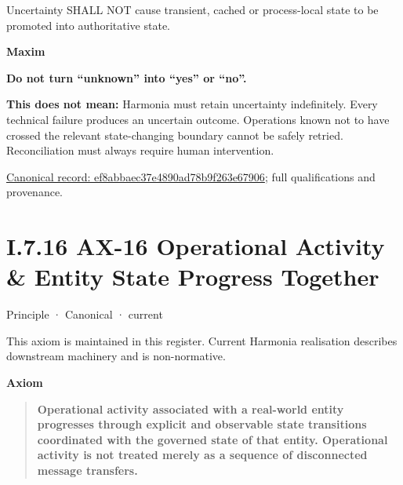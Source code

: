 Uncertainty SHALL NOT cause transient, cached or process-local state to be promoted into authoritative state.



\par\medskip\textbf{Maxim}\par


\textbf{Do not turn “unknown” into “yes” or “no”.}



\textbf{This does not mean:} Harmonia must retain uncertainty indefinitely. Every technical failure produces an uncertain outcome. Operations known not to have crossed the relevant state-changing boundary cannot be safely retried. Reconciliation must always require human intervention.


{\footnotesize \href{../../../../continuum/motivation/principle/ef8abbaec37e4890ad78b9f263e67906.md}{Canonical record: ef8abbaec37e4890ad78b9f263e67906}; full qualifications and provenance.}\par
\section*{I.7.16 AX-16 Operational Activity \& Entity State Progress Together}
\label{navigation:I.7.16}

\label{element:de7e90f46127455a9ec9ad3b9b48ba54}
{\small Principle · Canonical · current}\par

This axiom is maintained in this register. Current Harmonia realisation describes downstream machinery and is non-normative.



\par\medskip\textbf{Axiom}\par


\begin{quote}


\textbf{Operational activity associated with a real-world entity progresses through explicit and observable state transitions coordinated with the governed state of that entity. Operational activity is not treated merely as a sequence of disconnected message transfers.}



\end{quote}


